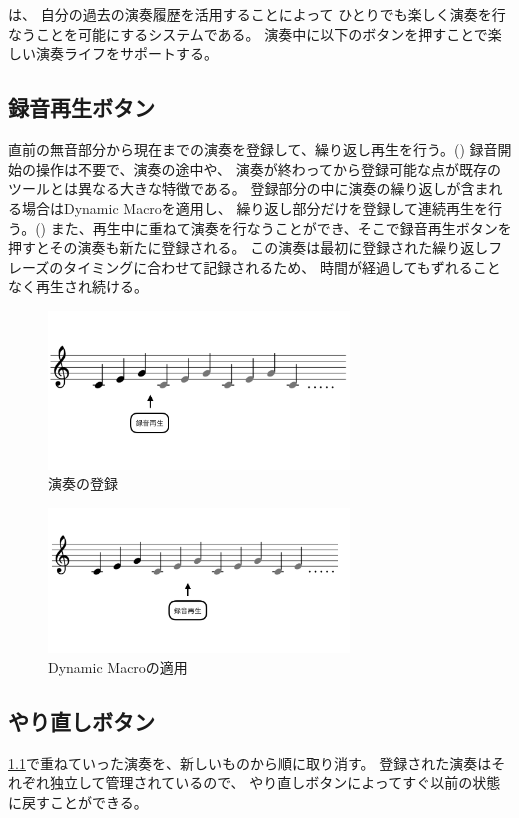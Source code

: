 %
%
\section{\system}
\label{repiano}

{\system}は、
自分の過去の演奏履歴を活用することによって
ひとりでも楽しく演奏を行なうことを可能にするシステムである。
演奏中に以下のボタンを押すことで楽しい演奏ライフをサポートする。

\subsection{録音再生ボタン}
\label{recplaybutton}

直前の無音部分から現在までの演奏を登録して、繰り返し再生を行う。()
録音開始の操作は不要で、演奏の途中や、
演奏が終わってから登録可能な点が既存のツールとは異なる大きな特徴である。
登録部分の中に演奏の繰り返しが含まれる場合はDynamic Macro\cite{masui}を適用し、
繰り返し部分だけを登録して連続再生を行う。()
また、再生中に重ねて演奏を行なうことができ、そこで録音再生ボタンを押すとその演奏も新たに登録される。
この演奏は最初に登録された繰り返しフレーズのタイミングに合わせて記録されるため、
時間が経過してもずれることなく再生され続ける。

\begin{figure}[tb]
\includegraphics[width=8cm,bb=0 0 1054 481]{images/rp1.png}
\centering
\caption{演奏の登録}
\label{recplay1}
\end{figure}

\begin{figure}[tb]
\includegraphics[width=8cm,bb=0 0 1054 481]{images/rp2.png}
\centering
\caption{Dynamic Macroの適用}
\label{recplay2}
\end{figure}

\subsection{やり直しボタン}

\ref{recplaybutton}で重ねていった演奏を、新しいものから順に取り消す。
登録された演奏はそれぞれ独立して管理されているので、
やり直しボタンによってすぐ以前の状態に戻すことができる。
